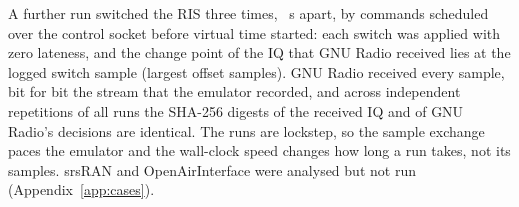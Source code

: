 A further run switched the RIS three times, \numEeSegmentS~s apart, by
commands scheduled over the control socket before virtual time started: each switch was
applied with zero lateness, and the change point of the IQ that GNU Radio received lies at the
logged switch sample (largest offset \numEeCpOffsetMax{} samples). GNU Radio received every
sample, bit for bit the stream that the emulator recorded, and across \txtEeReps{} independent
repetitions of all \numEeRuns{} runs the SHA-256 digests of the received IQ and of GNU Radio's
decisions are identical. The runs are lockstep, so the sample exchange paces
the emulator and the wall-clock speed changes how long a run takes, not its samples.
srsRAN and OpenAirInterface were analysed but not run
(Appendix~\ref{app:cases}).
